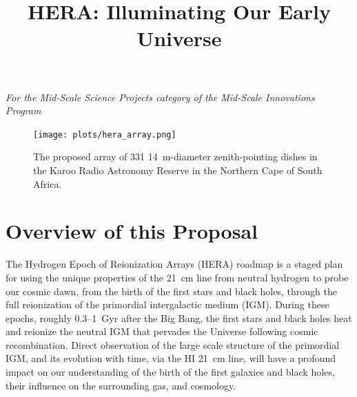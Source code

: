 \documentclass[preprint]{aastex}
\def\HI{{H{\small I }}}
\begin{document}
\title{HERA: Illuminating Our Early Universe}
{\it For the Mid-Scale Science Projects category of the Mid-Scale
Innovations Program}

\begin{figure}[H]\centering
\texttt{[image: plots/hera\_array.png]}
\caption{The proposed array of 331 14~m-diameter zenith-pointing dishes in the Karoo Radio Astronomy Reserve
in the Northern Cape of South Africa.
}\label{fig:hera_array} \end{figure}


\vspace{-0.4in}
\section{Overview of this Proposal} %


The Hydrogen Epoch of Reionization Arrays (HERA) roadmap is a staged
plan for using the unique properties of the 21~cm line from neutral
hydrogen to probe our cosmic dawn, from the birth of the first 
stars and black holes, through the full reionization of the primordial
intergalactic medium (IGM). 
During these epochs, roughly 0.3--1~Gyr after the Big Bang, the
first stars and black holes heat and reionize the neutral
IGM that pervades the Universe following cosmic
recombination. Direct observation of the large scale structure of the primordial
IGM, and its evolution with time, via the \HI 21~cm line, will
have a profound impact on our understanding of the birth of the first
galaxies and black holes, their influence on the surrounding gas,
and cosmology. 
\end{document}
